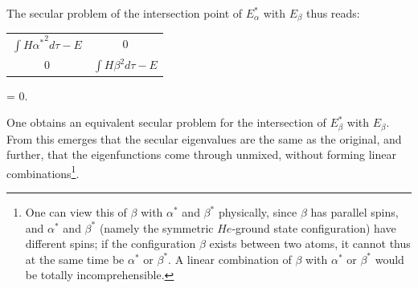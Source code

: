 \documentclass{article}
\begin{document}
The secular problem of the intersection point of $E_\alpha^*$ with $E_\beta$ thus reads:

\begin{tabular}{|cc|}
  $\int H{\alpha^*}^2 d\tau - E$ & $0$ \\
  $0$ & $\int H\beta^2 d\tau - E$
\end{tabular} = 0.

One obtains an equivalent secular problem for the intersection of $E_\beta^*$ with $E_\beta$. From this emerges that the secular eigenvalues are the same as the original, and further, that the eigenfunctions come through unmixed, without forming linear combinations\footnote{One can view this  of $\beta$ with $\alpha^*$ and $\beta^*$ physically, since $\beta$ has parallel spins, and $\alpha^*$ and $\beta^*$ (namely the symmetric $He$-ground state configuration) have different spins; if the configuration $\beta$ exists between two atoms, it cannot thus at the same time be $\alpha^*$ or $\beta^*$. A linear combination of $\beta$ with $\alpha^*$ or $\beta^*$ would be totally incomprehensible.}.
\end{document}
